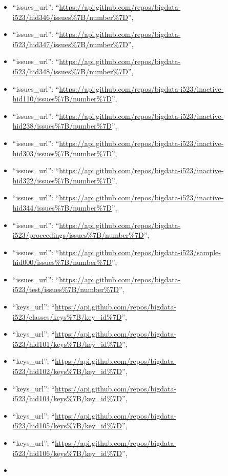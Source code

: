 \begin{itemize}
\item
  ``issues\_url'':
  ``\url{https://api.github.com/repos/bigdata-i523/hid346/issues\%7B/number\%7D}'',
\item
  ``issues\_url'':
  ``\url{https://api.github.com/repos/bigdata-i523/hid347/issues\%7B/number\%7D}'',
\item
  ``issues\_url'':
  ``\url{https://api.github.com/repos/bigdata-i523/hid348/issues\%7B/number\%7D}'',
\item
  ``issues\_url'':
  ``\url{https://api.github.com/repos/bigdata-i523/inactive-hid110/issues\%7B/number\%7D}'',
\item
  ``issues\_url'':
  ``\url{https://api.github.com/repos/bigdata-i523/inactive-hid238/issues\%7B/number\%7D}'',
\item
  ``issues\_url'':
  ``\url{https://api.github.com/repos/bigdata-i523/inactive-hid303/issues\%7B/number\%7D}'',
\item
  ``issues\_url'':
  ``\url{https://api.github.com/repos/bigdata-i523/inactive-hid322/issues\%7B/number\%7D}'',
\item
  ``issues\_url'':
  ``\url{https://api.github.com/repos/bigdata-i523/inactive-hid344/issues\%7B/number\%7D}'',
\item
  ``issues\_url'':
  ``\url{https://api.github.com/repos/bigdata-i523/proceedings/issues\%7B/number\%7D}'',
\item
  ``issues\_url'':
  ``\url{https://api.github.com/repos/bigdata-i523/sample-hid000/issues\%7B/number\%7D}'',
\item
  ``issues\_url'':
  ``\url{https://api.github.com/repos/bigdata-i523/test/issues\%7B/number\%7D}'',
\item
  ``keys\_url'':
  ``\url{https://api.github.com/repos/bigdata-i523/classes/keys\%7B/key_id\%7D}'',
\item
  ``keys\_url'':
  ``\url{https://api.github.com/repos/bigdata-i523/hid101/keys\%7B/key_id\%7D}'',
\item
  ``keys\_url'':
  ``\url{https://api.github.com/repos/bigdata-i523/hid102/keys\%7B/key_id\%7D}'',
\item
  ``keys\_url'':
  ``\url{https://api.github.com/repos/bigdata-i523/hid104/keys\%7B/key_id\%7D}'',
\item
  ``keys\_url'':
  ``\url{https://api.github.com/repos/bigdata-i523/hid105/keys\%7B/key_id\%7D}'',
\item
  ``keys\_url'':
  ``\url{https://api.github.com/repos/bigdata-i523/hid106/keys\%7B/key_id\%7D}'',
\item

\end{itemize}
